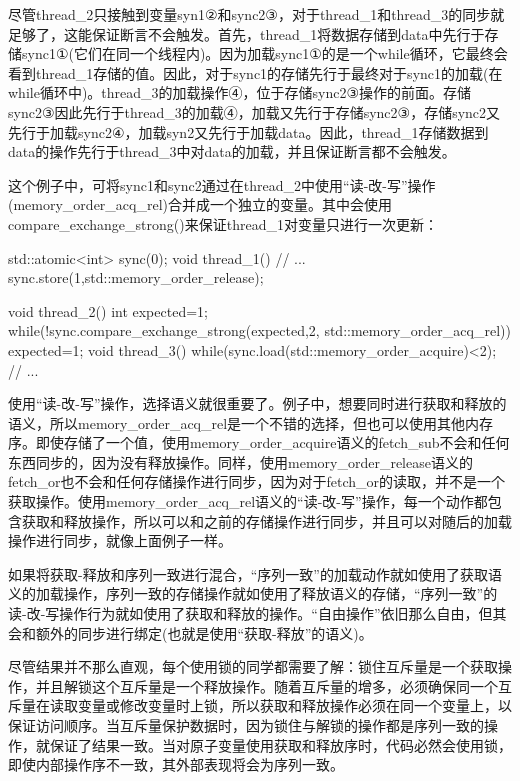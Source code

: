尽管thread\_2只接触到变量syn1②和sync2③，对于thread\_1和thread\_3的同步就足够了，这能保证断言不会触发。首先，thread\_1将数据存储到data中先行于存储sync1①(它们在同一个线程内)。因为加载sync1①的是一个while循环，它最终会看到thread\_1存储的值。因此，对于sync1的存储先行于最终对于sync1的加载(在while循环中)。thread\_3的加载操作④，位于存储sync2③操作的前面。存储sync2③因此先行于thread\_3的加载④，加载又先行于存储sync2③，存储sync2又先行于加载sync2④，加载syn2又先行于加载data。因此，thread\_1存储数据到data的操作先行于thread\_3中对data的加载，并且保证断言都不会触发。

这个例子中，可将sync1和sync2通过在thread\_2中使用“读-改-写”操作(memory\_order\_acq\_rel)合并成一个独立的变量。其中会使用compare\_exchange\_strong()来保证thread\_1对变量只进行一次更新：

\begin{cpp}
std::atomic<int> sync(0);
void thread_1()
{
  // ...
  sync.store(1,std::memory_order_release);
}

void thread_2()
{
  int expected=1;
  while(!sync.compare_exchange_strong(expected,2,
              std::memory_order_acq_rel))
    expected=1;
}
void thread_3()
{
  while(sync.load(std::memory_order_acquire)<2);
  // ...
}
\end{cpp}

使用“读-改-写”操作，选择语义就很重要了。例子中，想要同时进行获取和释放的语义，所以memory\_order\_acq\_rel是一个不错的选择，但也可以使用其他内存序。即使存储了一个值，使用memory\_order\_acquire语义的fetch\_sub不会和任何东西同步的，因为没有释放操作。同样，使用memory\_order\_release语义的fetch\_or也不会和任何存储操作进行同步，因为对于fetch\_or的读取，并不是一个获取操作。使用memory\_order\_acq\_rel语义的“读-改-写”操作，每一个动作都包含获取和释放操作，所以可以和之前的存储操作进行同步，并且可以对随后的加载操作进行同步，就像上面例子一样。

如果将获取-释放和序列一致进行混合，“序列一致”的加载动作就如使用了获取语义的加载操作，序列一致的存储操作就如使用了释放语义的存储，“序列一致”的读-改-写操作行为就如使用了获取和释放的操作。“自由操作”依旧那么自由，但其会和额外的同步进行绑定(也就是使用“获取-释放”的语义)。

尽管结果并不那么直观，每个使用锁的同学都需要了解：锁住互斥量是一个获取操作，并且解锁这个互斥量是一个释放操作。随着互斥量的增多，必须确保同一个互斥量在读取变量或修改变量时上锁，所以获取和释放操作必须在同一个变量上，以保证访问顺序。当互斥量保护数据时，因为锁住与解锁的操作都是序列一致的操作，就保证了结果一致。当对原子变量使用获取和释放序时，代码必然会使用锁，即使内部操作序不一致，其外部表现将会为序列一致。


